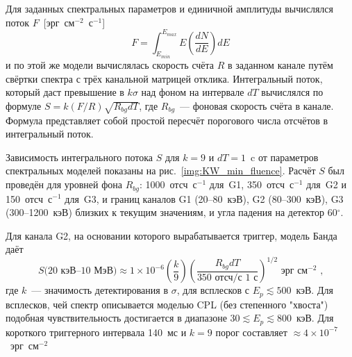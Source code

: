 Для заданных спектральных параметров и единичной амплитуды вычислялся поток $F$~[эрг~см$^{-2}$~с$^{-1}$]
\begin{equation}\label{eq:flux}
F = \int_{E_{min}}^{E_{max}} E \left(\frac{dN}{dE}\right) dE
\end{equation}
и по этой же модели вычислялась скорость счёта $R$ в заданном канале путём свёртки 
спектра с трёх канальной матрицей отклика. Интегральный поток, который даст 
превышение в $k\sigma$ над фоном на интервале $dT$ вычислялся по формуле $S = k (F/R) \sqrt{R_{bg} dT}$, 
где $R_{bg}$~--- фоновая скорость счёта в канале. Формула представляет собой простой 
пересчёт порогового числа отсчётов в интегральный поток.

Зависимость интегрального потока $S$ для $k=9$ и $dT=1$~c от параметров спектральных 
моделей показаны на рис.~\ref{img:KW_min_fluence}. Расчёт $S$ был проведён для уровней фона 
$R_{bg}$: 1000~отсч~с$^{-1}$ для~G1, 350~отсч~с$^{-1}$ для~G2 и 150~отсч~с$^{-1}$ для~G3, 
и границ каналов G1 (20--80~кэВ), G2 (80--300~кэВ), G3 (300--1200~кэВ) 
близких к текущим значениям, и угла падения на детектор 60$^{\circ}$. 

Для канала G2, на основании которого вырабатывается триггер, модель Банда даёт 
\begin{equation}\label{eq:KW_Smin}
S\mbox{(20~кэВ--10~МэВ)} \approx 1\times10^{-6}\left(\frac{k}{9}\right)
\left(\frac{R_{bg} dT}{350\mbox{ отсч/с } 1\mbox{ с}}\right)^{1/2}\mbox{ эрг~см}^{-2}\mbox{ ,}
\end{equation}
где $k$~--- значимость детектирования в $\sigma$,
для всплесков с $E_p \lesssim 500$~кэВ. Для всплесков, чей спектр описывается 
моделью CPL (без степенного "хвоста") подобная чувствительность достигается в диапазоне $30\lesssim E_p \lesssim 800$~кэВ.
Для короткого триггерного интервала 140~мс и $k=9$ порог составляет $\approx 4\times10^{-7}$~эрг~см$^{-2}$


